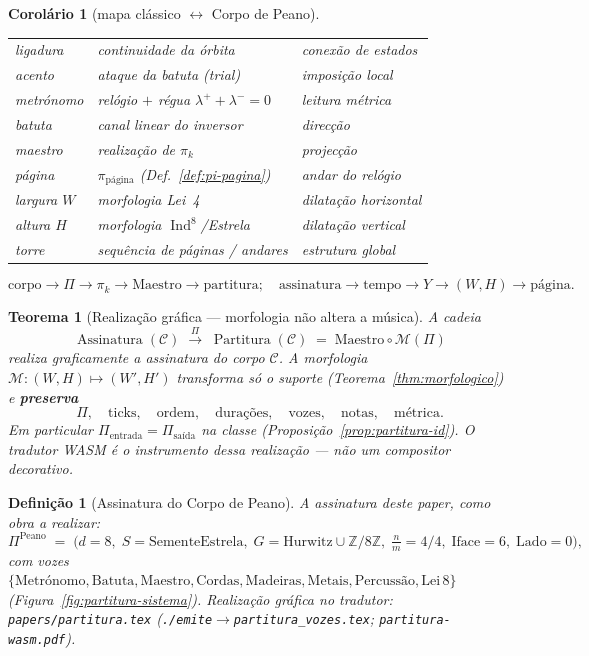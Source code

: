 \documentclass[11pt,a4paper]{article}
\newtheorem{definicao}{Definição}
\newtheorem{teorema}{Teorema}
\newtheorem{corolario}{Corolário}
\newcommand{\code}[1]{\texttt{#1}}
\begin{document}
\begin{corolario}[mapa clássico $\leftrightarrow$ Corpo de Peano]
\begin{center}
\begin{tabular}{@{}lll@{}}
ligadura & continuidade da órbita & conexão de estados \\
acento & ataque da batuta (trial) & imposição local \\
metrónomo & relógio $+$ régua $\lambda^{+}+\lambda^{-}=0$ & leitura métrica \\
batuta & canal linear do inversor & direcção \\
maestro & realização de $\pi_k$ & projecção \\
página & $\pi_{\mathrm{página}}$ (Def.~\ref{def:pi-pagina}) & andar do relógio \\
largura $W$ & morfologia Lei~4 & dilatação horizontal \\
altura $H$ & morfologia $\operatorname{Ind}^{8}$/Estrela & dilatação vertical \\
torre & sequência de páginas / andares & estrutura global \\
\end{tabular}
\end{center}
\[
\boxed{
\text{corpo}
\to\Pi\to\pi_k\to\text{Maestro}\to\text{partitura};
\quad
\text{assinatura}
\to\text{tempo}\to Y\to(W,H)\to\text{página}.
}
\]
\end{corolario}

\begin{teorema}[Realização gráfica --- morfologia não altera a música]
\label{thm:realizacao-grafica}
A cadeia
\[
\boxed{
\operatorname{Assinatura}(\mathcal{C})
\;\xrightarrow{\Pi}\;
\operatorname{Partitura}(\mathcal{C})
\;=\;
\mathrm{Maestro}\circ\mathcal{M}(\Pi)
}
\]
realiza graficamente a assinatura do corpo $\mathcal{C}$. A morfologia
$\mathcal{M}:(W,H)\mapsto(W',H')$ transforma só o suporte
(Teorema~\ref{thm:morfologico}) e \textbf{preserva}
\[
\Pi,\quad
\text{ticks},\quad
\text{ordem},\quad
\text{durações},\quad
\text{vozes},\quad
\text{notas},\quad
\text{métrica}.
\]
Em particular $\Pi_{\mathrm{entrada}}=\Pi_{\mathrm{saída}}$ na classe
(Proposição~\ref{prop:partitura-id}). O tradutor WASM é o instrumento
dessa realização --- não um compositor decorativo.
\end{teorema}

\begin{definicao}[Assinatura do Corpo de Peano]\label{def:assinatura-peano}
A assinatura deste paper, como obra a realizar:
\[
\Pi^{\mathrm{Peano}}
\;=\;
\bigl(
d{=}8,\;
S{=}\mathrm{SementeEstrela},\;
G{=}\mathrm{Hurwitz}\cup\mathbb{Z}/8\mathbb{Z},\;
\tfrac{n}{m}{=}4/4,\;
\mathrm{Iface}{=}6,\;
\mathrm{Lado}{=}0
\bigr),
\]
com vozes
$\{\mathrm{Metrónomo},\mathrm{Batuta},\mathrm{Maestro},
\mathrm{Cordas},\mathrm{Madeiras},\mathrm{Metais},\mathrm{Percussão},
\mathrm{Lei\,8}\}$
(Figura~\ref{fig:partitura-sistema}). Realização gráfica no
tradutor: \code{papers/partitura.tex}
(\code{./emite}$\to$\code{partitura\_vozes.tex};
\code{partitura-wasm.pdf}).
\end{definicao}
\end{document}
